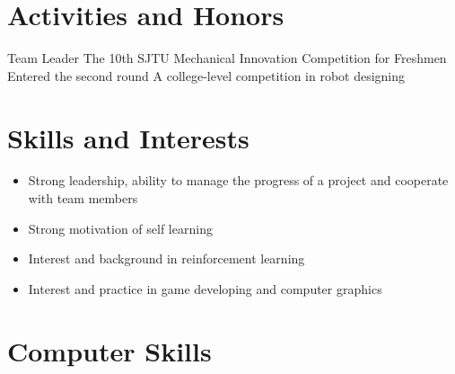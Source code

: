 \documentclass[11pt, a4paper, sans]{moderncv}
\begin{document}
\section{Activities and Honors}
{Team Leader}
{The 10th SJTU Mechanical Innovation Competition for Freshmen}
{}{Entered the second round}
{A college-level competition in robot designing}

\section{Skills and Interests}
\begin{itemize}
	\item Strong leadership, ability to manage the progress of a project and cooperate with team members
	\item Strong motivation of self learning
	\item Interest and background in reinforcement learning
	\item Interest and practice in game developing and computer graphics
\end{itemize}

\section{Computer Skills}
\end{document}
